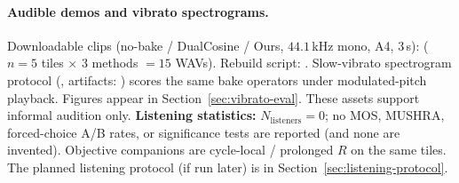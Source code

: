 
\paragraph{Audible demos and vibrato spectrograms.}
Downloadable clips (no-bake / DualCosine / Ours, $44.1$\,kHz mono, A4, $3$\,s):
($n{=}5$ tiles $\times$ $3$ methods $=15$ WAVs).
Rebuild script:
.
Slow-vibrato spectrogram protocol
(,
artifacts:
)
scores the same bake operators under modulated-pitch playback. Figures appear in Section~\ref{sec:vibrato-eval}.
These assets support informal audition only.
\textbf{Listening statistics:} $N_{\mathrm{listeners}}{=}0$; no MOS, MUSHRA, forced-choice A/B rates, or significance tests are reported (and none are invented).
Objective companions are cycle-local / prolonged $R$ on the same tiles.
The planned listening protocol (if run later) is in Section~\ref{sec:listening-protocol}.
